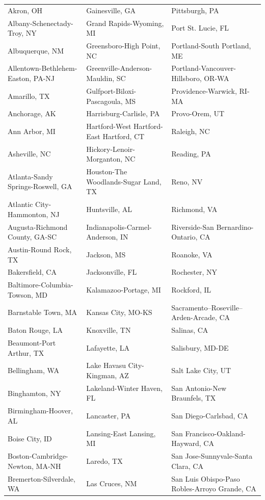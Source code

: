 \begin{longtable}[t]{>{\raggedright\arraybackslash}p{4.6cm}>{\raggedright\arraybackslash}p{4.6cm}>{\raggedright\arraybackslash}p{4.6cm}}
\endfoot
\bottomrule
\endlastfoot
Akron, OH & Gainesville, GA & Pittsburgh, PA\\
Albany-Schenectady-Troy, NY & Grand Rapids-Wyoming, MI & Port St. Lucie, FL\\
Albuquerque, NM & Greensboro-High Point, NC & Portland-South Portland, ME\\
Allentown-Bethlehem-Easton, PA-NJ & Greenville-Anderson-Mauldin, SC & Portland-Vancouver-Hillsboro, OR-WA\\
Amarillo, TX & Gulfport-Biloxi-Pascagoula, MS & Providence-Warwick, RI-MA\\
\addlinespace
Anchorage, AK & Harrisburg-Carlisle, PA & Provo-Orem, UT\\
Ann Arbor, MI & Hartford-West Hartford-East Hartford, CT & Raleigh, NC\\
Asheville, NC & Hickory-Lenoir-Morganton, NC & Reading, PA\\
Atlanta-Sandy Springs-Roswell, GA & Houston-The Woodlands-Sugar Land, TX & Reno, NV\\
Atlantic City-Hammonton, NJ & Huntsville, AL & Richmond, VA\\
\addlinespace
Augusta-Richmond County, GA-SC & Indianapolis-Carmel-Anderson, IN & Riverside-San Bernardino-Ontario, CA\\
Austin-Round Rock, TX & Jackson, MS & Roanoke, VA\\
Bakersfield, CA & Jacksonville, FL & Rochester, NY\\
Baltimore-Columbia-Towson, MD & Kalamazoo-Portage, MI & Rockford, IL\\
Barnstable Town, MA & Kansas City, MO-KS & Sacramento--Roseville--Arden-Arcade, CA\\
\addlinespace
Baton Rouge, LA & Knoxville, TN & Salinas, CA\\
Beaumont-Port Arthur, TX & Lafayette, LA & Salisbury, MD-DE\\
Bellingham, WA & Lake Havasu City-Kingman, AZ & Salt Lake City, UT\\
Binghamton, NY & Lakeland-Winter Haven, FL & San Antonio-New Braunfels, TX\\
Birmingham-Hoover, AL & Lancaster, PA & San Diego-Carlsbad, CA\\
\addlinespace
Boise City, ID & Lansing-East Lansing, MI & San Francisco-Oakland-Hayward, CA\\
Boston-Cambridge-Newton, MA-NH & Laredo, TX & San Jose-Sunnyvale-Santa Clara, CA\\
Bremerton-Silverdale, WA & Las Cruces, NM & San Luis Obispo-Paso Robles-Arroyo Grande, CA\\

\end{longtable}
